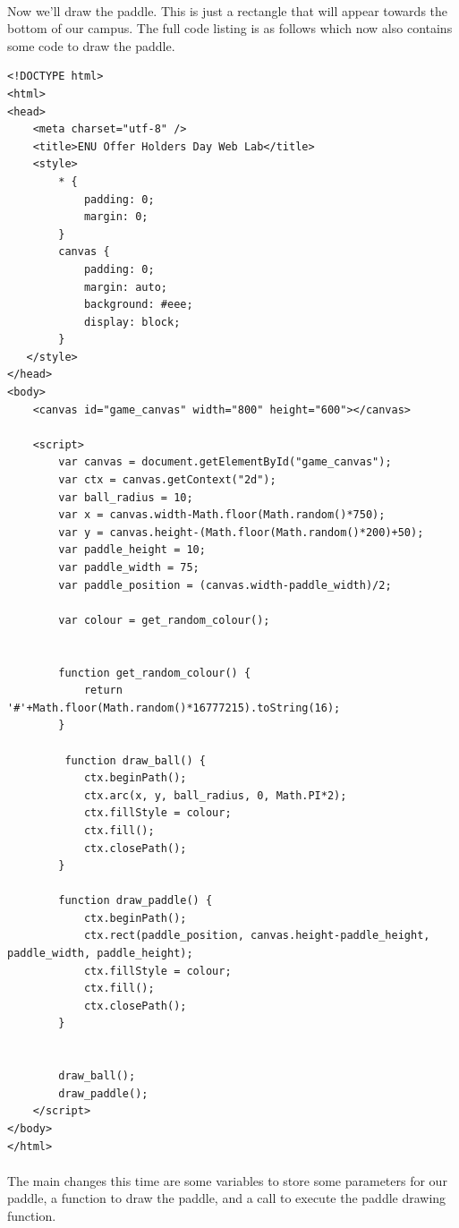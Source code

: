 \documentclass[10pt, a4paper, oneside]{article}
\begin{document}
\paragraph{} Now we'll draw the paddle. This is just a rectangle that will appear towards the bottom of our campus. The full code listing is as follows which now also contains some code to draw the paddle.

\begin{lstlisting}
<!DOCTYPE html>
<html>
<head>
    <meta charset="utf-8" />
    <title>ENU Offer Holders Day Web Lab</title>
    <style>
        * { 
            padding: 0; 
            margin: 0; 
        } 
        canvas { 
            padding: 0; 
            margin: auto; 
            background: #eee; 
            display: block; 
        }
   </style>
</head>
<body>
    <canvas id="game_canvas" width="800" height="600"></canvas>

    <script>
        var canvas = document.getElementById("game_canvas");
        var ctx = canvas.getContext("2d");
        var ball_radius = 10;
        var x = canvas.width-Math.floor(Math.random()*750);
        var y = canvas.height-(Math.floor(Math.random()*200)+50);
        var paddle_height = 10;
        var paddle_width = 75;
        var paddle_position = (canvas.width-paddle_width)/2;

        var colour = get_random_colour();


        function get_random_colour() {
            return '#'+Math.floor(Math.random()*16777215).toString(16);
        }

         function draw_ball() {
            ctx.beginPath();
            ctx.arc(x, y, ball_radius, 0, Math.PI*2);
            ctx.fillStyle = colour;
            ctx.fill();
            ctx.closePath();
        }

        function draw_paddle() {
            ctx.beginPath();
            ctx.rect(paddle_position, canvas.height-paddle_height, paddle_width, paddle_height);
            ctx.fillStyle = colour;
            ctx.fill();
            ctx.closePath();
        }

 
        draw_ball();
        draw_paddle();
    </script>
</body>
</html>
\end{lstlisting}

\paragraph{} The main changes this time are some variables to store some parameters for our paddle, a function to draw the paddle, and a call to execute the paddle drawing function.
\end{document}
